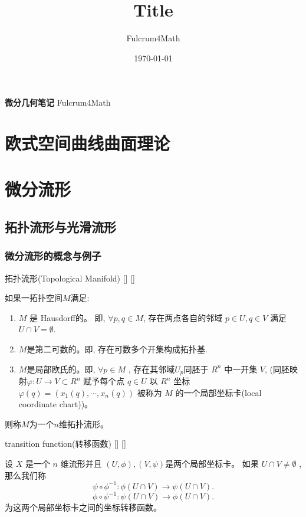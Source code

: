 \documentclass[UTF8]{ctexart}
\title{Title}
\author{Fulcrum4Math}
\date{\today}
\begin{document}
\begin{center}
    {\LARGE\textbf{微分几何笔记}}
    Fulcrum4Math
\end{center}

\tableofcontents

\newpage
    
\section{欧式空间曲线曲面理论}

\newpage

\section{微分流形}
    
    \subsection{拓扑流形与光滑流形}

    \subsubsection{微分流形的概念与例子}
    
    \begin{dfn}
        []
        {拓扑流形(Topological Manifold)}
        []
        []

        如果一拓扑空间$M$满足:
        \begin{enumerate}
            \item $M$ 是 Hausdorff的。 即, $ \forall p,q \in M $, 存在两点各自的邻域 $p \in U,q \in V$ 满足$ U \cap V = \emptyset $.
            \item $M$是第二可数的。即, 存在可数多个开集构成拓扑基. 
            \item $M$是局部欧氏的。即, 
            $\forall p \in M $ , 存在其邻域$U_p$同胚于 $R^n$ 中一开集 $V$,
            (同胚映射$\varphi : U \rightarrow V \subset R^n $ 赋予每个点 $q \in U$ 以 $R^n$ 坐标$\varphi(q)=(x_1(q), \cdots ,x_n(q))$ 被称为 $M$ 的一个局部坐标卡(local coordinate chart))。
        \end{enumerate}
       则称$M$为一个$n$维拓扑流形。
    \end{dfn}

    \begin{dfn}
        []
        {transition function(转移函数)}
        []
        []

        设 $X$ 是一个 $n$ 维流形并且 $(U, \phi) , (V , \psi)$是两个局部坐标卡。 
        如果 $U \cap V \neq \emptyset$ , 那么我们称
        \[ \psi \circ \phi^{-1}: \phi(U \cap V) \rightarrow \psi(U \cap V). \]
        \[ \phi \circ \psi^{-1} :\psi(U \cap V) \rightarrow \phi(U \cap V).  \]
        为这两个局部坐标卡之间的坐标转移函数。
    \end{dfn}
\end{document}
